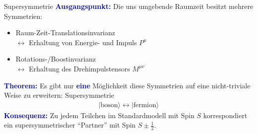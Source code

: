 \documentclass[hyperref={pdfpagelabels=false},ngerman]{beamer}
\renewcommand{\emph}[1]{\textbf{\textcolor{darkblue}{#1}}}
\begin{document}
\begin{frame}{Supersymmetrie}
  \emph{Ausgangspunkt:} Die uns umgebende Raumzeit besitzt mehrere
  Symmetrien:
  \begin{itemize}
  \item Raum-Zeit-Translationsinvarianz\\
    $\leftrightarrow$ Erhaltung von Energie- und Impuls $P^\mu$
  \item Rotations-/Boostinvarianz\\
    $\leftrightarrow$ Erhaltung des Drehimpulstensors $M^{\mu\nu}$
  \end{itemize}
  \vspace*{1em}
  \emph{Theorem:} Es gibt nur \emph{eine} Möglichkeit diese Symmetrien
  auf eine nicht-triviale Weise zu erweitern: Supersymmetrie
  \begin{align*}
    |\text{boson}\rangle \leftrightarrow |\text{fermion}\rangle
  \end{align*}
  \emph{Konsequenz:} Zu jedem Teilchen im Standardmodell mit Spin $S$
  korrespondiert ein supersymmetrischer ``Partner'' mit Spin
  $S \pm \frac{1}{2}$.
\end{frame}
\end{document}
